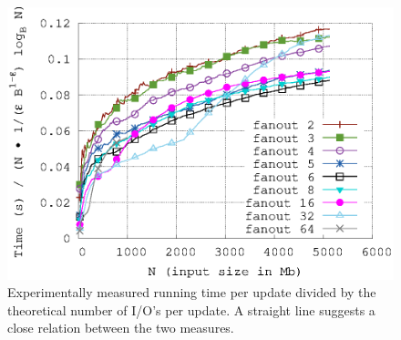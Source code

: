 \documentclass[twoside,11pt,openright]{report}
\begin{document}
\begin{figure}[h]
\begin{minipage}[t]{0.48\columnwidth}
  \label{fig:gerth_fanout_experiment_ios_divided_asymptotic}
\end{minipage}
\hfill
\begin{minipage}[t]{0.48\columnwidth}
  \centering
  \includegraphics[width=\linewidth]{../src/experiments/gerth_fanout_experiment_results/2016-05-06.11_52_24/time_divided_asymptotic}
  \caption{Experimentally measured running time per update divided by the theoretical number of I/O's per update. A straight line suggests a close relation between the two measures.}
  \label{fig:gerth_fanout_experiment_time_divided_asymptotic}
\end{minipage}
\end{figure}
\end{document}

